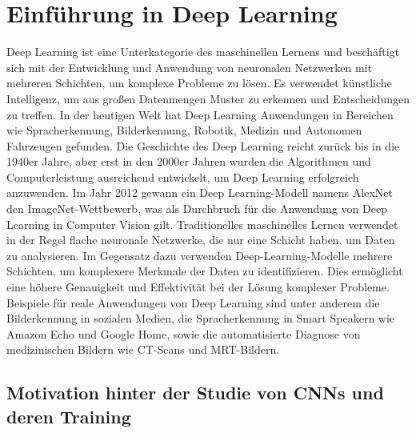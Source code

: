 \chapter{Einführung in Deep Learning}

    Deep Learning ist eine Unterkategorie des maschinellen Lernens und beschäftigt sich mit der Entwicklung und Anwendung von neuronalen Netzwerken mit mehreren Schichten, um komplexe Probleme zu lösen. Es verwendet künstliche Intelligenz, um aus großen Datenmengen Muster zu erkennen und Entscheidungen zu treffen. 
    In der heutigen Welt hat Deep Learning Anwendungen in Bereichen wie Spracherkennung, Bilderkennung, Robotik, Medizin und Autonomen Fahrzeugen gefunden. 
    Die Geschichte des Deep Learning reicht zurück bis in die 1940er Jahre, aber erst in den 2000er Jahren wurden die Algorithmen und Computerleistung ausreichend entwickelt, um Deep Learning erfolgreich anzuwenden. 
    Im Jahr 2012 gewann ein Deep Learning-Modell namens AlexNet den ImageNet-Wettbewerb, was als Durchbruch für die Anwendung von Deep Learning in Computer Vision gilt.
    Traditionelles maschinelles Lernen verwendet in der Regel flache neuronale Netzwerke, die nur eine Schicht haben, um Daten zu analysieren. 
    Im Gegensatz dazu verwenden Deep-Learning-Modelle mehrere Schichten, um komplexere Merkmale der Daten zu identifizieren. 
    Dies ermöglicht eine höhere Genauigkeit und Effektivität bei der Lösung komplexer Probleme.
    Beispiele für reale Anwendungen von Deep Learning sind unter anderem die Bilderkennung in sozialen Medien, die Spracherkennung in Smart Speakern wie Amazon Echo und Google Home, sowie die automatisierte Diagnose von medizinischen Bildern wie CT-Scans und MRT-Bildern.

\section{Motivation hinter der Studie von CNNs und deren Training}
    
